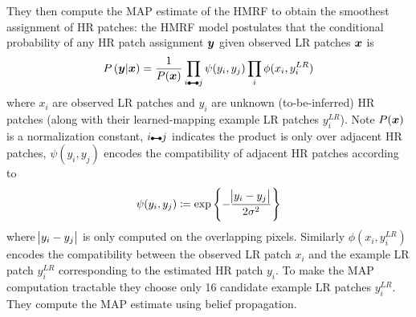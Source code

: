 %
They then compute the MAP estimate of the HMRF to obtain the smoothest assignment of HR patches: the HMRF model postulates that the conditional probability of any HR patch assignment \(\bm{y}\) given observed LR patches \(\bm{x}\) is
\begin{equation}
    P\left( \by \middle| \bx \right) = \frac{1}{P(\bx)} \prod_{i\ue{} j} \psi(y_i, y_j) \prod_i \phi(x_i, y_i^{LR})
\end{equation}
where \(x_i\) are observed LR patches and \(y_i\) are unknown (to-be-inferred) HR patches (along with their learned-mapping example LR patches \(y_i^{LR}\)).
%
Note \(P(\bm{x})\) is a normalization constant, \(i\ue{} j\) indicates the product is only over adjacent HR patches, \(\psi(y_i, y_j)\) encodes the compatibility of adjacent HR patches according to
\begin{equation}
    \psi(y_i, y_j) \coloneqq \exp \left\{ -  \frac{\abs{ y_i - y_j }}{2\sigma^2} \right\}
\end{equation}
where \(\abs{ y_i - y_j }\) is only computed on the overlapping pixels.
%
Similarly \(\phi(x_i, y_i^{LR})\) encodes the compatibility between the observed LR patch \(x_i\) and the example LR patch \(y_i^{LR}\) corresponding to the estimated HR patch \(y_i\).
%
To make the MAP computation tractable they choose only 16 candidate example LR patches \(y_i^{LR}\).
%
They compute the MAP estimate using belief propagation.
